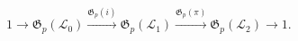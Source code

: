 \(\displaystyle
1 \longrightarrow \mathfrak G_p(\mathcal L_0)
  \xrightarrow{\mathfrak G_p(i)}
\mathfrak G_p(\mathcal L_1)
  \xrightarrow{\mathfrak G_p(\pi)}
\mathfrak G_p(\mathcal L_2)
  \longrightarrow 1 .
\)
